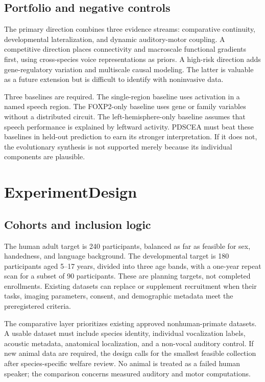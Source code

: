 \documentclass[conference]{IEEEtran}
\begin{document}
\subsection{Portfolio and negative controls}

The primary direction combines three evidence streams: comparative continuity, developmental lateralization, and dynamic auditory-motor coupling. A competitive direction places connectivity and macroscale functional gradients first, using cross-species voice representations as priors. A high-risk direction adds gene-regulatory variation and multiscale causal modeling. The latter is valuable as a future extension but is difficult to identify with noninvasive data.

Three baselines are required. The single-region baseline uses activation in a named speech region. The FOXP2-only baseline uses gene or family variables without a distributed circuit. The left-hemisphere-only baseline assumes that speech performance is explained by leftward activity. PDSCEA must beat these baselines in held-out prediction to earn its stronger interpretation. If it does not, the evolutionary synthesis is not supported merely because its individual components are plausible.

\section{ExperimentDesign}

\subsection{Cohorts and inclusion logic}

The human adult target is 240 participants, balanced as far as feasible for sex, handedness, and language background. The developmental target is 180 participants aged 5--17 years, divided into three age bands, with a one-year repeat scan for a subset of 90 participants. These are planning targets, not completed enrollments. Existing datasets can replace or supplement recruitment when their tasks, imaging parameters, consent, and demographic metadata meet the preregistered criteria.

The comparative layer prioritizes existing approved nonhuman-primate datasets. A usable dataset must include species identity, individual vocalization labels, acoustic metadata, anatomical localization, and a non-vocal auditory control. If new animal data are required, the design calls for the smallest feasible collection after species-specific welfare review. No animal is treated as a failed human speaker; the comparison concerns measured auditory and motor computations.
\end{document}
